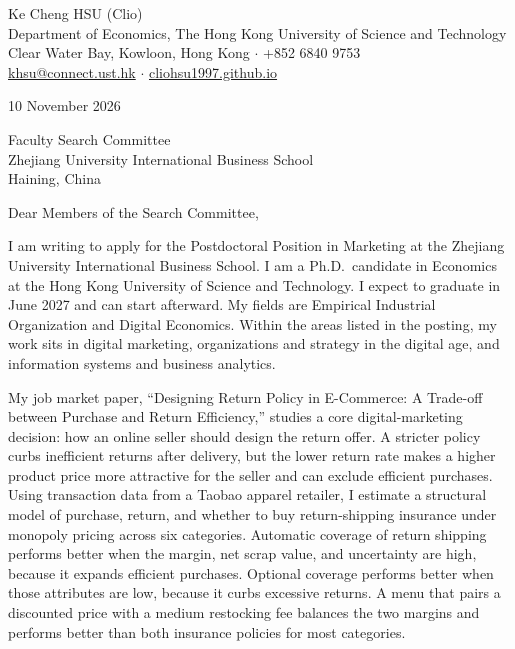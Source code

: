 \documentclass[11pt]{article}
\begin{document}
\begin{flushleft}
Ke Cheng HSU (Clio) \\
Department of Economics, The Hong Kong University of Science and Technology \\
Clear Water Bay, Kowloon, Hong Kong $\cdot$ +852 6840 9753 \\
\href{mailto:khsu@connect.ust.hk}{khsu@connect.ust.hk} $\cdot$ \href{https://cliohsu1997.github.io/}{cliohsu1997.github.io}
\end{flushleft}

10 November 2026

\vspace{0.15em}
Faculty Search Committee \\
Zhejiang University International Business School \\
Haining, China

\vspace{0.15em}
Dear Members of the Search Committee,

I am writing to apply for the Postdoctoral Position in Marketing at the Zhejiang University International Business School. I am a Ph.D.\ candidate in Economics at the Hong Kong University of Science and Technology. I expect to graduate in June 2027 and can start afterward. My fields are Empirical Industrial Organization and Digital Economics. Within the areas listed in the posting, my work sits in digital marketing, organizations and strategy in the digital age, and information systems and business analytics.

My job market paper, ``Designing Return Policy in E-Commerce: A Trade-off between Purchase and Return Efficiency,'' studies a core digital-marketing decision: how an online seller should design the return offer. A stricter policy curbs inefficient returns after delivery, but the lower return rate makes a higher product price more attractive for the seller and can exclude efficient purchases. Using transaction data from a Taobao apparel retailer, I estimate a structural model of purchase, return, and whether to buy return-shipping insurance under monopoly pricing across six categories. Automatic coverage of return shipping performs better when the margin, net scrap value, and uncertainty are high, because it expands efficient purchases. Optional coverage performs better when those attributes are low, because it curbs excessive returns. A menu that pairs a discounted price with a medium restocking fee balances the two margins and performs better than both insurance policies for most categories.
\end{document}
